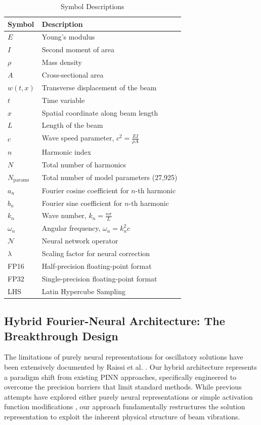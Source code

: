 \begin{table}[ht]
\centering
\caption{Symbol Descriptions}
\label{tab:symbols}
\begin{tabular}{ll}
\hline
\textbf{Symbol} & \textbf{Description} \\ \hline
$E$ & Young's modulus \\
$I$ & Second moment of area \\
$\rho$ & Mass density \\
$A$ & Cross-sectional area \\
$w(t,x)$ & Transverse displacement of the beam \\
$t$ & Time variable \\
$x$ & Spatial coordinate along beam length \\
$L$ & Length of the beam \\
$c$ & Wave speed parameter, $c^2 = \frac{EI}{\rho A}$ \\
$n$ & Harmonic index \\
$N$ & Total number of harmonics \\
$N_{\text{params}}$ & Total number of model parameters (27,925) \\
$a_n$ & Fourier cosine coefficient for $n$-th harmonic \\
$b_n$ & Fourier sine coefficient for $n$-th harmonic \\
$k_n$ & Wave number, $k_n = \frac{n\pi}{L}$ \\
$\omega_n$ & Angular frequency, $\omega_n = k_n^2 c$ \\
$\mathcal{N}$ & Neural network operator \\
$\lambda$ & Scaling factor for neural correction \\
FP16 & Half-precision floating-point format \\
FP32 & Single-precision floating-point format \\
LHS & Latin Hypercube Sampling \\
\hline
\end{tabular}
\end{table}

\subsection{Hybrid Fourier-Neural Architecture: The Breakthrough Design}
\label{subsec:fourier_neural}

The limitations of purely neural representations for oscillatory solutions have been extensively documented by Raissi et al. \cite{raissi2019physics}. Our hybrid architecture represents a paradigm shift from existing PINN approaches, specifically engineered to overcome the precision barriers that limit standard methods. While previous attempts have explored either purely neural representations or simple activation function modifications \cite{wong2022learning}, our approach fundamentally restructures the solution representation to exploit the inherent physical structure of beam vibrations.

